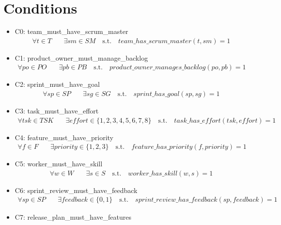 \documentclass{article}
\begin{document}
\section{Conditions}
\begin{itemize}
    \item C0: team\_must\_have\_scrum\_master
        \begin{align*}
            \forall t \in T \quad &\exists sm \in SM \quad \text{s.t.} \quad team\_has\_scrum\_master(t, sm) = 1
        \end{align*}
    \item C1: product\_owner\_must\_manage\_backlog
        \begin{align*}
            \forall po \in PO \quad &\exists pb \in PB \quad \text{s.t.} \quad product\_owner\_manages\_backlog(po, pb) = 1
        \end{align*}
    \item C2: sprint\_must\_have\_goal
        \begin{align*}
            \forall sp \in SP \quad &\exists sg \in SG \quad \text{s.t.} \quad sprint\_has\_goal(sp, sg) = 1
        \end{align*}
    \item C3: task\_must\_have\_effort
        \begin{align*}
            \forall tsk \in TSK \quad &\exists effort \in \{1, 2, 3, 4, 5, 6, 7, 8\} \quad \text{s.t.} \quad task\_has\_effort(tsk, effort) = 1
        \end{align*}
    \item C4: feature\_must\_have\_priority
        \begin{align*}
            \forall f \in F \quad &\exists priority \in \{1, 2, 3\} \quad \text{s.t.} \quad feature\_has\_priority(f, priority) = 1
        \end{align*}
    \item C5: worker\_must\_have\_skill
        \begin{align*}
            \forall w \in W \quad &\exists s \in S \quad \text{s.t.} \quad worker\_has\_skill(w, s) = 1
        \end{align*}
    \item C6: sprint\_review\_must\_have\_feedback
        \begin{align*}
            \forall sp \in SP \quad &\exists feedback \in \{0, 1\} \quad \text{s.t.} \quad sprint\_review\_has\_feedback(sp, feedback) = 1
        \end{align*}
    \item C7: release\_plan\_must\_have\_features

\end{itemize}
\end{document}
